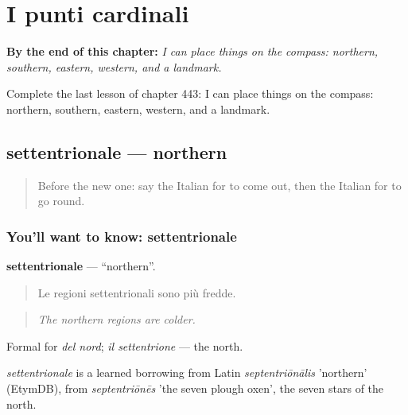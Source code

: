 
\chapter{I punti cardinali}
\label{ch:it-i-punti-cardinali}

\begin{chapteropening}
\textbf{By the end of this chapter:} \emph{I can place things on the compass: northern, southern, eastern, western, and a landmark.}

Complete the last lesson of chapter 443: I can place things on the compass: northern, southern, eastern, western, and a landmark.
\end{chapteropening}

\section[settentrionale]{settentrionale — northern}

\label{lesson:IT-C443-settentrionale}



\begin{quote}
Before the new one: say the Italian for to come out, then the Italian for to go round.
\end{quote}

\subsection*{You'll want to know: settentrionale}
\textbf{settentrionale} — \textquotedblleft{}northern\textquotedblright{}.

\begin{quote}
Le regioni settentrionali sono più fredde.
\end{quote}

\begin{quote}
\emph{The northern regions are colder.}
\end{quote}

Formal for \emph{del nord}; \emph{il settentrione} — the north.

\begin{cousinweb}
\emph{settentrionale} is a learned borrowing from Latin \emph{septentriōnālis} 'northern' (EtymDB), from \emph{septentriōnēs} 'the seven plough oxen', the seven stars of the north.
\end{cousinweb}

